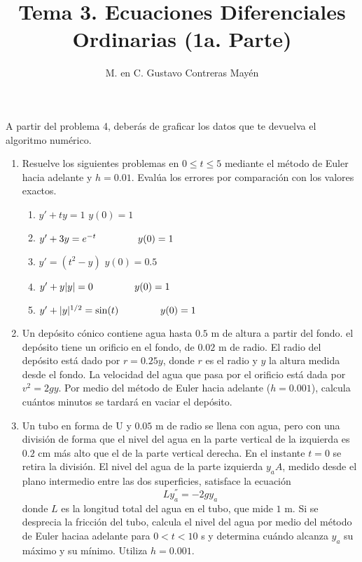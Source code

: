 \documentclass[12pt]{article}
\title{Tema 3. Ecuaciones Diferenciales Ordinarias (1a. Parte)}
\author{M. en C. Gustavo Contreras May\'{e}n}
\begin{document}
\maketitle
A partir del problema 4, deber\'{a}s de graficar los datos que te devuelva el algoritmo num\'{e}rico.
\begin{enumerate}
\item Resuelve los siguientes problemas en $0 \leq t \leq 5$ mediante el m\'{e}todo de Euler hacia adelante y $h=0.01$. Eval\'{u}a los errores por comparaci\'{o}n con los valores exactos.\\
\begin{enumerate}
	\item $y'+ty=1$ \hspace{1.5cm} $y(0)=1$
	\item $y'+3y = e^{-t} \hspace{1.5cm} y(0)=1$
	\item $y'= (t^{2} - y)$\hspace{1.5cm} $y(0)=0.5$
	\item $y'+y \vert y \vert = 0 \hspace{1.5cm} y(0)=1$
	\item $y' + \vert y \vert^{1/2} = \sin(t) \hspace{1.5cm} y(0)=1$
\end{enumerate}
\item Un dep\'{o}sito c\'{o}nico contiene agua hasta $0.5$ m de altura a partir del fondo. el dep\'{o}sito tiene un orificio en el fondo, de $0.02$ m de radio. El radio del dep\'{o}sito est\'{a} dado por $r=0.25y$, donde $r$ es el radio y $y$ la altura medida desde el fondo. La velocidad del agua que pasa por el orificio est\'{a} dada por $v^{2}=2gy$. Por medio del m\'{e}todo de Euler hacia adelante ($h=0.001$), calcula cu\'{a}ntos minutos se tardar\'{a} en vaciar el dep\'{o}sito.
\item Un tubo en forma de U y $0.05$ m de radio se llena con agua, pero con una divisi\'{o}n de forma que el nivel del agua en la parte vertical de la izquierda es $0.2$ cm m\'{a}s alto que el de la parte vertical derecha. En el instante $t=0$ se retira la divisi\'{o}n. El nivel del agua de la parte izquierda $y_{a}A$, medido desde el plano intermedio entre las dos superficies, satisface la ecuaci\'{o}n
\[ Ly_{a}^{''} = -2 gy_{a} \]
donde $L$ es la longitud total del agua en el tubo, que mide $1$ m. Si se desprecia la fricci\'{o}n del tubo, calcula el nivel del agua por medio del m\'{e}todo de Euler haciaa adelante para $0 < t < 10$ s y determina cu\'{a}ndo alcanza $y_{a}$ su m\'{a}ximo y su m\'{i}nimo. Utiliza $h=0.001$.

\end{enumerate}
\end{document}
